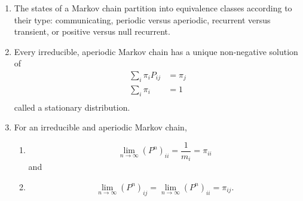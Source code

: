 \documentclass[12pt]{article}
\begin{document}
\begin{enumerate}
    \item
        The states of a Markov chain partition into equivalence classes
        according to their type:  communicating, periodic versus
        aperiodic, recurrent versus transient, or positive versus null
        recurrent.
    \item
        Every irreducible, aperiodic Markov chain has a unique
        non-negative solution of
        \begin{align*}
            \sum\limits_{i} \pi_{i} P_{ij} &= \pi_{j} \\
            \sum\limits_{i} \pi_{i} &= 1 \\
        \end{align*}
        called a stationary distribution.
    \item
        For an irreducible and aperiodic Markov chain,
        \begin{enumerate}
            \item
                \[
                    \lim_{n \to \infty} (P^{n})_{ii} = \frac{1}{m_i} =
                    \pi_{ii}
                \] and
            \item
                \[
                    \lim_{n \to \infty} (P^{n})_{ij} = \lim_{n \to
                    \infty} (P^ {n})_{ii} =\pi_{ij}.
                \]
        \end{enumerate}
\end{enumerate}

\hr

\end{document}
